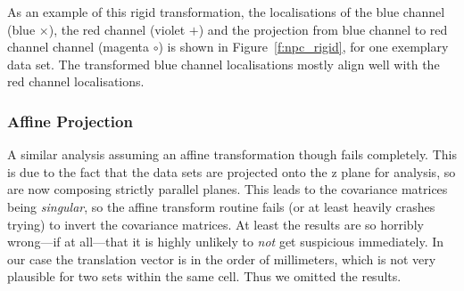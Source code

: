 \documentclass[11pt, a4paper, oneside, twocolumn]{report}
\newcommand{\e}{\emph}
\begin{document}
As an example of this rigid transformation, the localisations of the
blue channel (blue $\times$), the red channel (violet $+$) and the
projection from blue channel to red channel channel (magenta $\circ$)
is shown in Figure~\ref{f:npc_rigid}, for one exemplary data set. The
transformed blue channel localisations mostly align well with the red
channel localisations.


\subsubsection{Affine Projection}\label{s:r:dcnpca}

A similar analysis assuming an affine transformation though fails
completely. This is due to the fact that the data sets are projected
onto the z plane for analysis, so are now composing strictly parallel
planes. This leads to the covariance matrices being \e{singular}, so
the affine transform routine fails (or at least heavily crashes
trying) to invert the covariance matrices. At least the results are so
horribly wrong---if at all---that it is highly unlikely to \e{not} get
suspicious immediately. In our case the translation vector is in the
order of millimeters, which is not very plausible for two sets within
the same cell. Thus we omitted the results.
\end{document}

